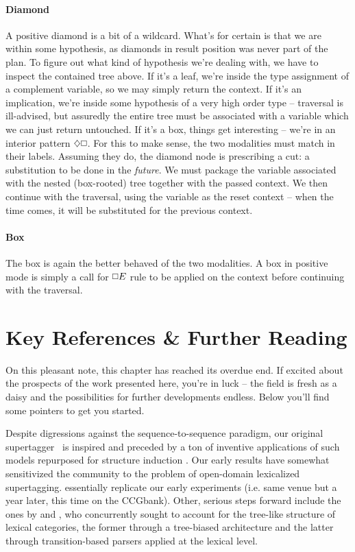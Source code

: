 \paragraph{Diamond}
A positive diamond is a bit of a wildcard.
What's for certain is that we are within some hypothesis, as diamonds in result position was never part of the plan.
To figure out what kind of hypothesis we're dealing with, we have to inspect the contained tree above.
If it's a leaf, we're inside the type assignment of a complement variable, so we may simply return the context.
If it's an implication, we're inside some hypothesis of a very high order type -- traversal is ill-advised, but assuredly the entire tree must be associated with a variable which we can just return untouched.
If it's a box, things get interesting -- we're in an interior pattern $\diamond\bx$.
For this to make sense, the two modalities must match in their labels.
Assuming they do, the diamond node is prescribing a cut: a substitution to be done in the \textit{future}.
We must package the variable associated with the nested (box-rooted) tree together with the passed context.
We then continue with the traversal, using the variable as the reset context -- when the time comes, it will be substituted for the previous context.

\paragraph{Box}
The box is again the better behaved of the two modalities.
A box in positive mode is simply a call for $\bx E$ rule to be applied on the context before continuing with the traversal.

\section{Key References \& Further Reading}
On this pleasant note, this chapter has reached its overdue end.
If excited about the prospects of the work presented here, you're in luck -- the field is fresh as a daisy and the possibilities for further developments endless.
Below you'll find some pointers to get you started.

Despite digressions against the sequence-to-sequence paradigm, our original supertagger~\cite{kogkalidis-etal-2019-constructive} is inspired and preceded by a ton of inventive applications of such models repurposed for structure induction \cite[inter alia]{vinyals2015grammar,wiseman2016sequence,dong-lapata-2016-language,buys2017robust}.
Our early results have somewhat sensitivized the community to the problem of open-domain lexicalized supertagging.
 essentially replicate our early experiments (i.e. same venue but a year later, this time on the CCGbank).
Other, serious steps forward include the ones by \citet{prange-etal-2021-supertagging} and \citet{Liu_Ji_Wu_Lan_2021}, who concurrently sought to account for the tree-like structure of lexical categories, the former through a tree-biased architecture and the latter through transition-based parsers applied at the lexical level.

